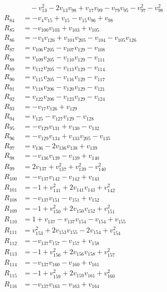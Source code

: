 \begin{align*}
&\quad-v_{13}^{2}-2v_{13}v_{98}+v_{17}v_{99}-v_{79}v_{95}-v_{97}^{2}-v_{98}^{2}\\[2pt]
R_{84}&=-v_{4}v_{15}+v_{15}-v_{15}v_{96}+v_{98}\\[2pt]
R_{85}&=-v_{100}v_{103}+v_{103}+v_{105}\\[2pt]
R_{86}&=-v_{3}v_{126}+v_{101}v_{205}-v_{104}-v_{105}v_{126}\\[2pt]
R_{87}&=v_{106}v_{205}-v_{107}v_{129}-v_{108}\\[2pt]
R_{88}&=v_{109}v_{205}-v_{110}v_{129}-v_{111}\\[2pt]
R_{89}&=v_{112}v_{205}-v_{113}v_{129}-v_{114}\\[2pt]
R_{90}&=v_{115}v_{205}-v_{116}v_{129}-v_{117}\\[2pt]
R_{91}&=v_{118}v_{206}-v_{120}v_{129}-v_{121}\\[2pt]
R_{92}&=v_{122}v_{206}-v_{123}v_{129}-v_{124}\\[2pt]
R_{93}&=-v_{17}v_{126}+v_{129}\\[2pt]
R_{94}&=v_{125}-v_{127}v_{129}-v_{128}\\[2pt]
R_{95}&=-v_{129}v_{131}+v_{130}-v_{132}\\[2pt]
R_{96}&=-v_{129}v_{134}+v_{133}v_{205}-v_{135}\\[2pt]
R_{97}&=v_{136}-2v_{136}v_{138}+v_{139}\\[2pt]
R_{98}&=-v_{136}v_{139}-v_{139}+v_{140}\\[2pt]
R_{99}&=2v_{137}+v_{137}^{2}+v_{139}^{2}-v_{140}^{2}\\[2pt]
R_{100}&=-v_{137}v_{142}-v_{142}+v_{143}\\[2pt]
R_{101}&=-1+v_{141}^{2}+2v_{141}v_{143}+v_{142}^{2}\\[2pt]
R_{108}&=-v_{137}v_{151}-v_{151}+v_{152}\\[2pt]
R_{109}&=-1+v_{150}^{2}+2v_{150}v_{152}+v_{151}^{2}\\[2pt]
R_{110}&=1+v_{137}-v_{137}v_{154}-v_{154}+v_{155}\\[2pt]
R_{111}&=v_{153}^{2}+2v_{153}v_{155}-2v_{154}+v_{154}^{2}\\[2pt]
R_{112}&=-v_{137}v_{157}-v_{157}+v_{158}\\[2pt]
R_{113}&=-1+v_{156}^{2}+2v_{156}v_{158}+v_{157}^{2}\\[2pt]
R_{114}&=-v_{137}v_{160}-v_{160}+v_{161}\\[2pt]
R_{115}&=-1+v_{159}^{2}+2v_{159}v_{161}+v_{160}^{2}\\[2pt]
R_{116}&=-v_{137}v_{163}-v_{163}+v_{164}\\[2pt]

\end{align*}
